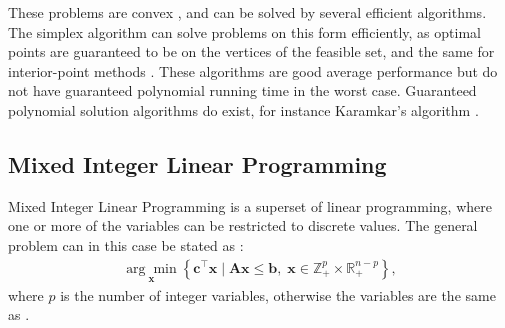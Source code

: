 These problems are convex \cite{wolsey2020integer}, and can be solved by several efficient algorithms. The simplex algorithm can solve problems on this form efficiently, as optimal points are guaranteed to be on the vertices of the feasible set, and the same for interior-point methods \cite{nocedal2006numerical}. These algorithms are good average performance but do not have guaranteed polynomial running time in the worst case. Guaranteed polynomial solution algorithms do exist, for instance Karamkar's algorithm \cite{karamkar1984new}. 


\subsection{Mixed Integer Linear Programming}

Mixed Integer Linear Programming is a superset of linear programming, where one or more of the variables can be restricted to discrete values. The general problem can in this case be stated as \cite{gasse2019exact}:
\begin{align}\label{eq:milp}
    \underset{\mathbf{x}}{\arg \min }\left\{\mathbf{c}^{\top} \mathbf{x} \mid \mathbf{A} \mathbf{x} \leq \mathbf{b}, \; \mathbf{x} \in \mathbb{Z}_+^{p} \times \mathbb{R}_+^{n-p}\right\},
\end{align}
where $ p $ is the number of integer variables, otherwise the variables are the same as .

